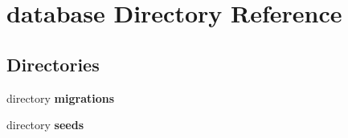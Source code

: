 \section{database Directory Reference}
\label{dir_eebfb77232beb3a60efbd23e05e85375}
\subsection*{Directories}
\begin{DoxyCompactItemize}
\item 
directory {\bf migrations}
\item 
directory {\bf seeds}
\end{DoxyCompactItemize}
